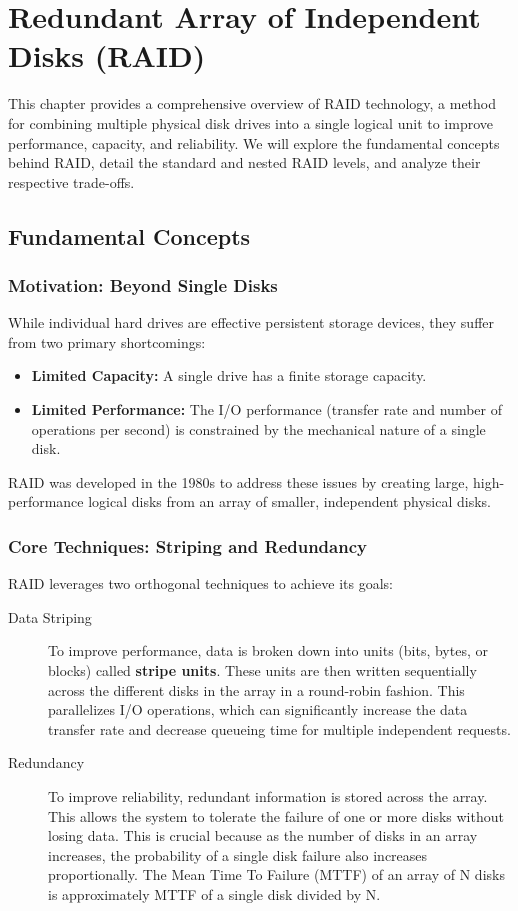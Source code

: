 \chapter{Redundant Array of Independent Disks (RAID)}

This chapter provides a comprehensive overview of RAID technology, a method for combining multiple physical disk drives into a single logical unit to improve performance, capacity, and reliability. We will explore the fundamental concepts behind RAID, detail the standard and nested RAID levels, and analyze their respective trade-offs.

\section{Fundamental Concepts}

\subsection{Motivation: Beyond Single Disks}
While individual hard drives are effective persistent storage devices, they suffer from two primary shortcomings:
\begin{itemize}
    \item \textbf{Limited Capacity:} A single drive has a finite storage capacity.
    \item \textbf{Limited Performance:} The I/O performance (transfer rate and number of operations per second) is constrained by the mechanical nature of a single disk.
\end{itemize}
RAID was developed in the 1980s to address these issues by creating large, high-performance logical disks from an array of smaller, independent physical disks.

\subsection{Core Techniques: Striping and Redundancy}
RAID leverages two orthogonal techniques to achieve its goals:
\begin{description}
    \item[Data Striping] To improve performance, data is broken down into units (bits, bytes, or blocks) called \textbf{stripe units}. These units are then written sequentially across the different disks in the array in a round-robin fashion. This parallelizes I/O operations, which can significantly increase the data transfer rate and decrease queueing time for multiple independent requests.
    \item[Redundancy] To improve reliability, redundant information is stored across the array. This allows the system to tolerate the failure of one or more disks without losing data. This is crucial because as the number of disks in an array increases, the probability of a single disk failure also increases proportionally. The Mean Time To Failure (MTTF) of an array of N disks is approximately MTTF of a single disk divided by N.
\end{description}

